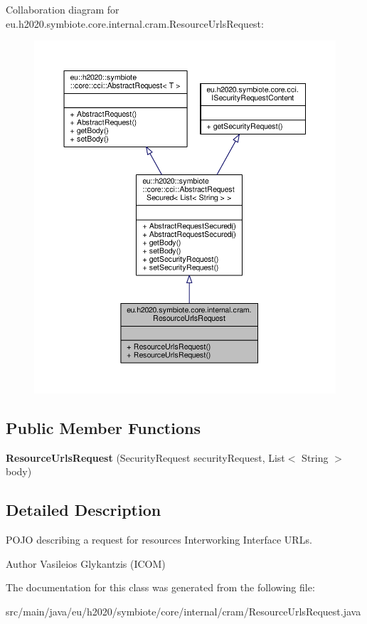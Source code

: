 Collaboration diagram for eu.\+h2020.\+symbiote.\+core.\+internal.\+cram.\+Resource\+Urls\+Request\+:
\nopagebreak
\begin{figure}[H]
\begin{center}
\leavevmode
\includegraphics[width=350pt]{classeu_1_1h2020_1_1symbiote_1_1core_1_1internal_1_1cram_1_1ResourceUrlsRequest__coll__graph}
\end{center}
\end{figure}
\subsection*{Public Member Functions}
\begin{DoxyCompactItemize}
\item 
\mbox{\label{classeu_1_1h2020_1_1symbiote_1_1core_1_1internal_1_1cram_1_1ResourceUrlsRequest_a55e1abb2a3ef75adb9db136badb45db9}} 
{\bfseries Resource\+Urls\+Request} (Security\+Request security\+Request, List$<$ String $>$ body)
\end{DoxyCompactItemize}


\subsection{Detailed Description}
P\+O\+JO describing a request for resources\textquotesingle{} Interworking Interface U\+R\+Ls. \begin{DoxyAuthor}{Author}
Vasileios Glykantzis (I\+C\+OM) 
\end{DoxyAuthor}


The documentation for this class was generated from the following file\+:\begin{DoxyCompactItemize}
\item 
src/main/java/eu/h2020/symbiote/core/internal/cram/Resource\+Urls\+Request.\+java\end{DoxyCompactItemize}
